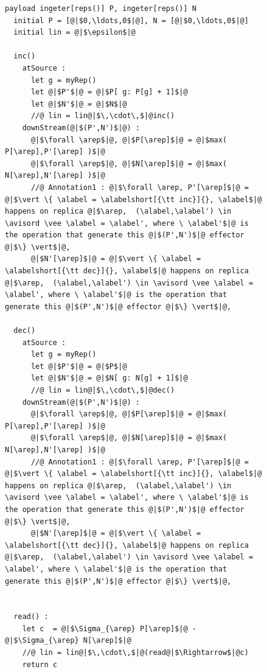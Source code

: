 \begin{figure}[t]
\begin{lstlisting}[frame=top,caption={Pseudo-code of operation-based PN-counter},
captionpos=b,label={lst:operation-based PN-counter}]
  payload ingeter[reps()] P, ingeter[reps()] N
  initial P = [@|$0,\ldots,0$|@], N = [@|$0,\ldots,0$|@]
  initial lin = @|$\epsilon$|@

  inc()
    atSource :
      let g = myRep()
      let @|$P'$|@ = @|$P[ g: P[g] + 1]$|@
      let @|$N'$|@ = @|$N$|@
      //@ lin = lin@|$\,\cdot\,$|@inc()
    downStream(@|$(P',N')$|@) :
      @|$\forall \arep$|@, @|$P[\arep]$|@ = @|$max( P[\arep],P'[\arep] )$|@
      @|$\forall \arep$|@, @|$N[\arep]$|@ = @|$max( N[\arep],N'[\arep] )$|@
      //@ Annotation1 : @|$\forall \arep, P'[\arep]$|@ = @|$\vert \{ \alabel = \alabelshort[{\tt inc}]{}, \alabel$|@ happens on replica @|$\arep,  (\alabel,\alabel') \in \avisord \vee \alabel = \alabel', where \ \alabel'$|@ is the operation that generate this @|$(P',N')$|@ effector @|$\} \vert$|@,
      @|$N'[\arep]$|@ = @|$\vert \{ \alabel = \alabelshort[{\tt dec}]{}, \alabel$|@ happens on replica @|$\arep,  (\alabel,\alabel') \in \avisord \vee \alabel = \alabel', where \ \alabel'$|@ is the operation that generate this @|$(P',N')$|@ effector @|$\} \vert$|@,

  dec()
    atSource :
      let g = myRep()
      let @|$P'$|@ = @|$P$|@
      let @|$N'$|@ = @|$N[ g: N[g] + 1]$|@
      //@ lin = lin@|$\,\cdot\,$|@dec()
    downStream(@|$(P',N')$|@) :
      @|$\forall \arep$|@, @|$P[\arep]$|@ = @|$max( P[\arep],P'[\arep] )$|@
      @|$\forall \arep$|@, @|$N[\arep]$|@ = @|$max( N[\arep],N'[\arep] )$|@
      //@ Annotation1 : @|$\forall \arep, P'[\arep]$|@ = @|$\vert \{ \alabel = \alabelshort[{\tt inc}]{}, \alabel$|@ happens on replica @|$\arep,  (\alabel,\alabel') \in \avisord \vee \alabel = \alabel', where \ \alabel'$|@ is the operation that generate this @|$(P',N')$|@ effector @|$\} \vert$|@,
      @|$N'[\arep]$|@ = @|$\vert \{ \alabel = \alabelshort[{\tt dec}]{}, \alabel$|@ happens on replica @|$\arep,  (\alabel,\alabel') \in \avisord \vee \alabel = \alabel', where \ \alabel'$|@ is the operation that generate this @|$(P',N')$|@ effector @|$\} \vert$|@,


  read() :
    let c  = @|$\Sigma_{\arep} P[\arep]$|@ - @|$\Sigma_{\arep} N[\arep]$|@
    //@ lin = lin@|$\,\cdot\,$|@(read@|$\Rightarrow$|@c)
    return c
\end{lstlisting}
\end{figure}



